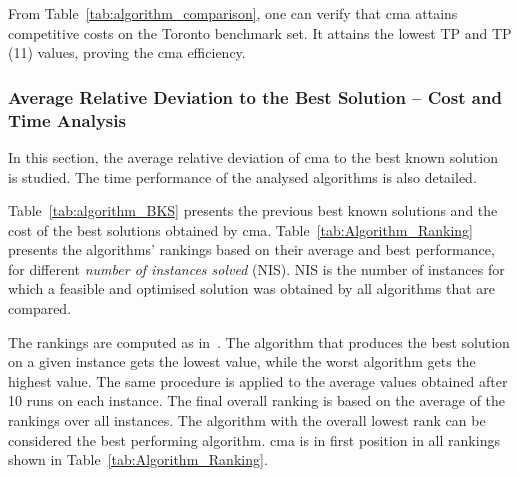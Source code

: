From Table~\ref{tab:algorithm_comparison}, one can verify that \gls{cma} attains competitive costs on the Toronto benchmark set. It attains the lowest TP and TP (11) values, proving the \gls{cma} efficiency.



\subsubsection{Average Relative Deviation to the Best Solution -- Cost and Time Analysis}

In this section, the average relative deviation of \gls{cma} to the best known solution is studied. The time performance of the analysed algorithms is also detailed. 

Table~\ref{tab:algorithm_BKS} presents the previous best known solutions and the cost of the best solutions obtained by \gls{cma}. Table~\ref{tab:Algorithm_Ranking} presents the algorithms' rankings based on their average and best performance, for different \textit{number of instances solved} (NIS). NIS is the number of instances for which a feasible and optimised solution was obtained by all algorithms that are compared. 

The rankings are computed as in~\cite{Demeester2012}. The algorithm that produces the best solution on a given instance gets the lowest value, while the worst algorithm gets the highest value. The same procedure is applied to the average values obtained after 10 runs on each instance. The final overall ranking is based on the average of the rankings over all instances. The algorithm with the overall lowest rank can be considered the best performing algorithm. \gls{cma} is in first position in all rankings shown in Table~\ref{tab:Algorithm_Ranking}.



